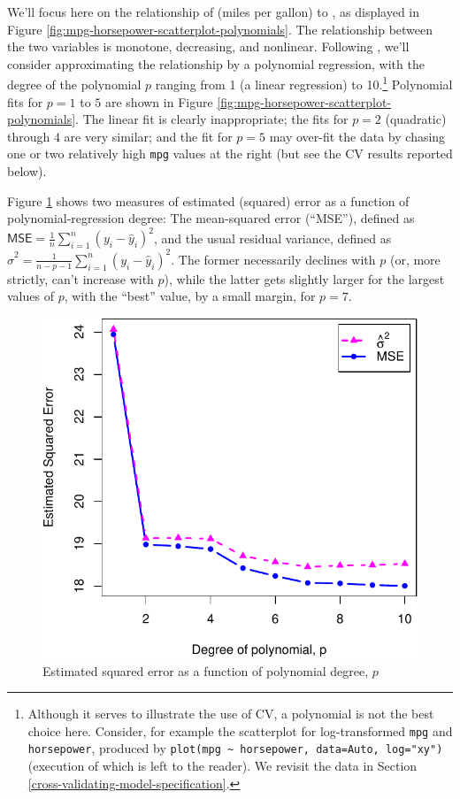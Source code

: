 \documentclass[
]{jss}
\begin{document}
We'll focus here on the relationship of  (miles per gallon) to
, as displayed in Figure
\ref{fig:mpg-horsepower-scatterplot-polynomials}. The relationship
between the two variables is monotone, decreasing, and nonlinear.
Following \citet{JamesEtAl:2021}, we'll consider approximating the
relationship by a polynomial regression, with the degree of the
polynomial \(p\) ranging from 1 (a linear regression) to 10.\footnote{Although
  it serves to illustrate the use of CV, a polynomial is not the best
  choice here. Consider, for example the scatterplot for log-transformed
  \texttt{mpg} and \texttt{horsepower}, produced by
  \texttt{plot(mpg\ \textasciitilde{}\ horsepower,\ data=Auto,\ log="xy")}
  (execution of which is left to the reader). We revisit the 
  data in Section \ref{cross-validating-model-specification}.}
Polynomial fits for \(p = 1\) to \(5\) are shown in Figure
\ref{fig:mpg-horsepower-scatterplot-polynomials}. The linear fit is
clearly inappropriate; the fits for \(p = 2\) (quadratic) through \(4\)
are very similar; and the fit for \(p = 5\) may over-fit the data by
chasing one or two relatively high \texttt{mpg} values at the right (but
see the CV results reported below).

Figure \ref{fig:mpg-horsepower-MSE-se} shows two measures of estimated
(squared) error as a function of polynomial-regression degree: The
mean-squared error (``MSE''), defined as
\(\mathsf{MSE} = \frac{1}{n}\sum_{i=1}^n (y_i - \widehat{y}_i)^2\), and
the usual residual variance, defined as
\(\widehat{\sigma}^2 = \frac{1}{n - p - 1} \sum_{i=1}^n (y_i - \widehat{y}_i)^2\).
The former necessarily declines with \(p\) (or, more strictly, can't
increase with \(p\)), while the latter gets slightly larger for the
largest values of \(p\), with the ``best'' value, by a small margin, for
\(p = 7\).

\begin{CodeChunk}
\begin{figure}

{\centering \includegraphics[width=0.5\linewidth]{JSS-article-3_files/figure-latex/mpg-horsepower-MSE-se-1} 

}

\caption[Estimated squared error as a function of polynomial degree, $p$]{Estimated squared error as a function of polynomial degree, $p$}\label{fig:mpg-horsepower-MSE-se}
\end{figure}
\end{CodeChunk}
\end{document}
